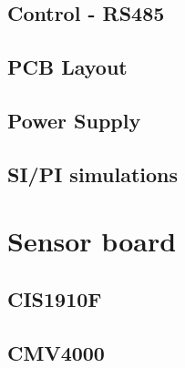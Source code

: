 \subsection{Control - RS485}
\subsection{PCB Layout}
\subsection{Power Supply}

\subsection{SI/PI simulations}

\section{Sensor board}
\subsection{CIS1910F}
\subsection{CMV4000}



